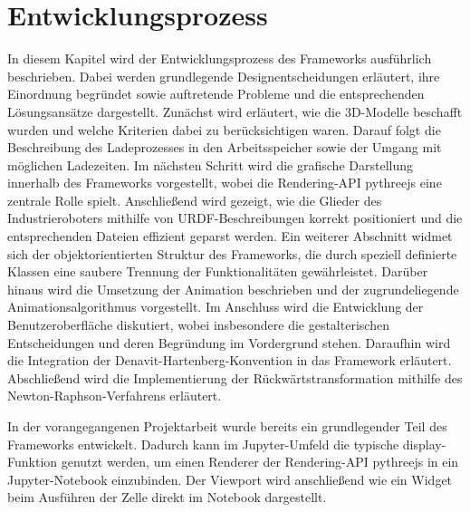 \section{Entwicklungsprozess}
In diesem Kapitel wird der Entwicklungsprozess des Frameworks ausführlich beschrieben.
Dabei werden grundlegende Designentscheidungen erläutert,
ihre Einordnung begründet sowie auftretende Probleme und die entsprechenden Lösungsansätze dargestellt.  
Zunächst wird erläutert, wie die 3D-Modelle beschafft wurden und welche Kriterien dabei zu berücksichtigen waren.
Darauf folgt die Beschreibung des Ladeprozesses in den Arbeitsspeicher sowie der Umgang mit möglichen Ladezeiten.  
Im nächsten Schritt wird die grafische Darstellung innerhalb des Frameworks vorgestellt, wobei die Rendering-API pythreejs eine zentrale Rolle spielt.  
Anschließend wird gezeigt, wie die Glieder des Industrieroboters mithilfe von URDF-Beschreibungen korrekt positioniert und die entsprechenden Dateien effizient geparst werden.
Ein weiterer Abschnitt widmet sich der objektorientierten Struktur des Frameworks, die durch speziell definierte Klassen eine saubere Trennung der Funktionalitäten gewährleistet.  
Darüber hinaus wird die Umsetzung der Animation beschrieben und der zugrundeliegende Animationsalgorithmus vorgestellt.  
Im Anschluss wird die Entwicklung der Benutzeroberfläche diskutiert, wobei insbesondere die gestalterischen Entscheidungen und deren Begründung im Vordergrund stehen.  
Daraufhin wird die Integration der Denavit-Hartenberg-Konvention in das Framework erläutert. 
Abschließend wird die Implementierung der Rückwärtstransformation mithilfe des Newton-Raphson-Verfahrens erläutert.



In der vorangegangenen Projektarbeit wurde bereits ein grundlegender Teil des Frameworks entwickelt.
Dadurch kann im Jupyter-Umfeld die typische display-Funktion genutzt werden,
um einen Renderer der Rendering-API pythreejs in ein Jupyter-Notebook einzubinden.
Der Viewport wird anschließend wie ein Widget beim Ausführen der Zelle direkt im Notebook dargestellt.





